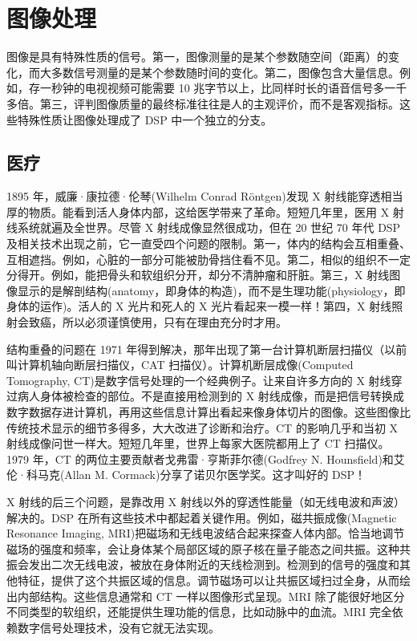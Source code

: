 \section{图像处理}

图像是具有特殊性质的信号。第一，图像测量的是某个参数随空间（距离）的变化，而大多数信号测量的是某个参数随时间的变化。第二，图像包含大量信息。例如，存一秒钟的电视视频可能需要
10
兆字节以上，比同样时长的语音信号多一千多倍。第三，评判图像质量的最终标准往往是人的主观评价，而不是客观指标。这些特殊性质让图像处理成了
DSP 中一个独立的分支。

\subsection{医疗}

1895 年，威廉·康拉德·伦琴(Wilhelm Conrad Röntgen)发现 X
射线能穿透相当厚的物质。能看到活人身体内部，这给医学带来了革命。短短几年里，医用
X 射线系统就遍及全世界。尽管 X 射线成像显然很成功，但在 20 世纪 70 年代
DSP
及相关技术出现之前，它一直受四个问题的限制。第一，体内的结构会互相重叠、互相遮挡。例如，心脏的一部分可能被肋骨挡住看不见。第二，相似的组织不一定分得开。例如，能把骨头和软组织分开，却分不清肿瘤和肝脏。第三，X
射线图像显示的是解剖结构(anatomy，即身体的构造)，而不是生理功能(physiology，即身体的运作)。活人的
X 光片和死人的 X 光片看起来一模一样！第四，X
射线照射会致癌，所以必须谨慎使用，只有在理由充分时才用。

结构重叠的问题在 1971
年得到解决，那年出现了第一台计算机断层扫描仪（以前叫计算机轴向断层扫描仪，CAT
扫描仪）。计算机断层成像(Computed Tomography,
CT)是数字信号处理的一个经典例子。让来自许多方向的 X
射线穿过病人身体被检查的部位。不是直接用检测到的 X
射线成像，而是把信号转换成数字数据存进计算机，再用这些信息计算出看起来像身体切片的图像。这些图像比传统技术显示的细节多得多，大大改进了诊断和治疗。CT
的影响几乎和当初 X
射线成像问世一样大。短短几年里，世界上每家大医院都用上了 CT 扫描仪。1979
年，CT 的两位主要贡献者戈弗雷·亨斯菲尔德(Godfrey N.
Hounsfield)和艾伦·科马克(Allan M. Cormack)分享了诺贝尔医学奖。这才叫好的
DSP！

X 射线的后三个问题，是靠改用 X
射线以外的穿透性能量（如无线电波和声波）解决的。DSP
在所有这些技术中都起着关键作用。例如，磁共振成像(Magnetic Resonance
Imaging,
MRI)把磁场和无线电波结合起来探查人体内部。恰当地调节磁场的强度和频率，会让身体某个局部区域的原子核在量子能态之间共振。这种共振会发出二次无线电波，被放在身体附近的天线检测到。检测到的信号的强度和其他特征，提供了这个共振区域的信息。调节磁场可以让共振区域扫过全身，从而绘出内部结构。这些信息通常和
CT 一样以图像形式呈现。MRI
除了能很好地区分不同类型的软组织，还能提供生理功能的信息，比如动脉中的血流。MRI
完全依赖数字信号处理技术，没有它就无法实现。

